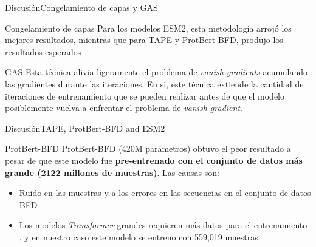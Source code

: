 \documentclass[10pt]{beamer}
\newcommand{\1}{
	\setbeamertemplate{background}{
		\texttt{[image: img/1]}
		\tikz[overlay] \fill[fill opacity=0.75,fill=white] (0,0) rectangle (-\paperwidth,\paperheight);
	}
}
\begin{document}
\begin{frame}{Discusión}{Congelamiento de capas y GAS}
	
	
	\begin{block}{Congelamiento de capas}
	Para los modelos ESM2, esta metodología arrojó los mejores resultados, mientras que para TAPE y ProtBert-BFD, produjo los resultados esperados
	\end{block}

\pause
	
	\begin{block}{GAS}
	Esta técnica alivia ligeramente el problema de \textit{vanish gradients} acumulando las gradientes durante las iteraciones. En si, este técnica extiende la cantidad de iteraciones de entrenamiento que se pueden realizar antes de que el modelo posiblemente vuelva a enfrentar el problema de \textit{vanish gradient}.
	\end{block}
\end{frame}


\begin{frame}{Discusión}{TAPE, ProtBert-BFD and ESM2}
	
	\begin{block}{ProtBert-BFD}
		ProtBert-BFD (420M parámetros) obtuvo el peor resultado a pesar de que este modelo fue \textbf{pre-entrenado con el conjunto de datos más grande (2122 millones de muestras)}. Las causas son: 
	\end{block}

	\begin{block}{}
		\begin{itemize}
			\item  Ruido en las muestras y a los errores en las secuencias en el conjunto de datos BFD \cite{elnaggar2021prottrans}
			\item Los modelos \textit{Transformer} grandes requieren más datos para el entrenamiento \cite{elnaggar2021prottrans}, y en nuestro caso este modelo se entreno con 559,019 muestras.
		\end{itemize}
	\end{block}
	
\end{frame}
\end{document}
